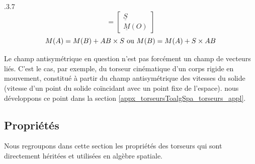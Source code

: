 \vspace{0.3cm} %

{.3}{.7}{}
{%
\begin{equation*}
[\underline{T}]=
\begin{bmatrix}
  \underline{S} \\
  \underline{M}(O)
\end{bmatrix}
\end{equation*}
}
{%
\begin{equation}
M(A)=M(B)+AB \times S \textnormal{ ou } M(B)=M(A)+S \times AB
\end{equation}
}
{}

\vspace{0.3cm} %

Le champ antisymétrique en question n'est pas forcément un champ de vecteurs liés. C'est le cas, par exemple, du torseur cinématique d'un corps rigide en mouvement, constitué à partir du champ antisymétrique des vitesses du solide (vitesse d'un point du solide coïncidant avec un point fixe de l'espace). nous développons ce point dans la section \ref{appx_torseursToalgSpa_torseurs_appl}.

\subsection{Propriétés} \label{appx_torseursToalgSpa_torseurs_prop}

Nous regroupons dans cette section les propriétés des torseurs qui sont directement héritées et utilisées en algèbre spatiale.

